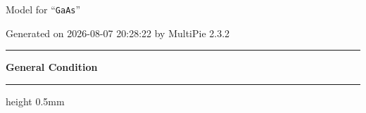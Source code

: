 \documentclass[fleqn,10pt,landscape]{jsarticle}
\begin{document}
\setcounter{MaxMatrixCols}{32}

\renewcommand{\tablename}{Table~}
\renewcommand{\figurename}{Figure~}
\setlength{\baselineskip}{16pt}
\setlength{\parindent}{0pt}
\setlength{\mathindent}{0pt}
\footnotesize
\begin{center}
\LARGE
Model for ``\texttt{GaAs}''
\end{center}
\begin{flushright}
Generated on 2026-08-07 20:28:22 by MultiPie 2.3.2
\end{flushright}
\setlength{\baselineskip}{16pt}
\footnotesize
\vspace{5mm}
\noindent \rule[0.5mm]{5mm}{0.5mm}\hspace{3mm}\textbf{General Condition}\hspace{3mm}\leaders\hrule height 0.5mm\hfill\kern0pt
\vspace{3mm}
\end{document}
